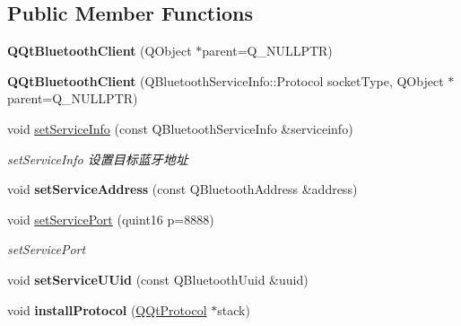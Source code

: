 \subsection*{Public Member Functions}
\begin{DoxyCompactItemize}
\item 
\mbox{\label{class_q_qt_bluetooth_client_a5b360c45c2f8479e765206fe653b6a89}} 
{\bfseries Q\+Qt\+Bluetooth\+Client} (Q\+Object $\ast$parent=Q\+\_\+\+N\+U\+L\+L\+P\+TR)
\item 
\mbox{\label{class_q_qt_bluetooth_client_a99196a6799070e80e4a07bc4a391f8de}} 
{\bfseries Q\+Qt\+Bluetooth\+Client} (Q\+Bluetooth\+Service\+Info\+::\+Protocol socket\+Type, Q\+Object $\ast$parent=Q\+\_\+\+N\+U\+L\+L\+P\+TR)
\item 
\mbox{\label{class_q_qt_bluetooth_client_a8f3a87c02f21a936f5e4daf8fdba5174}} 
void \mbox{\hyperlink{class_q_qt_bluetooth_client_a8f3a87c02f21a936f5e4daf8fdba5174}{set\+Service\+Info}} (const Q\+Bluetooth\+Service\+Info \&serviceinfo)
\begin{DoxyCompactList}\small\item\em set\+Service\+Info 设置目标蓝牙地址 \end{DoxyCompactList}\item 
\mbox{\label{class_q_qt_bluetooth_client_ac2a9753dabc14059fd0b670e166447bb}} 
void {\bfseries set\+Service\+Address} (const Q\+Bluetooth\+Address \&address)
\item 
void \mbox{\hyperlink{class_q_qt_bluetooth_client_a72a544fcb28b317772038cd622cd3d52}{set\+Service\+Port}} (quint16 p=8888)
\begin{DoxyCompactList}\small\item\em set\+Service\+Port \end{DoxyCompactList}\item 
\mbox{\label{class_q_qt_bluetooth_client_a99f79de496612abe7aa08f5ed285c2c0}} 
void {\bfseries set\+Service\+U\+Uid} (const Q\+Bluetooth\+Uuid \&uuid)
\item 
\mbox{\label{class_q_qt_bluetooth_client_a1c38f51855c39ab20c137b8e19ba8537}} 
void {\bfseries install\+Protocol} (\mbox{\hyperlink{class_q_qt_protocol}{Q\+Qt\+Protocol}} $\ast$stack)

\end{DoxyCompactItemize}
